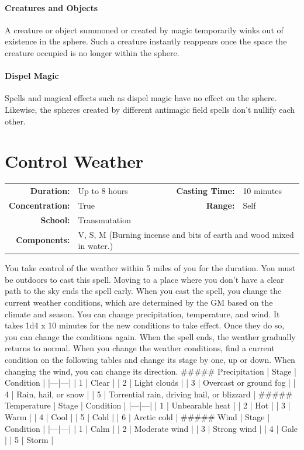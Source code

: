 \documentclass[12pt,showtrims]{memoir}
\begin{document}
\paragraph{Creatures and Objects} A creature or object summoned or created by magic temporarily winks out of existence in the sphere. Such a creature instantly reappears once the space the creature occupied is no longer within the sphere. \paragraph{Dispel Magic} Spells and magical effects such as dispel magic have no effect on the sphere. Likewise, the spheres created by different antimagic field spells don't nullify each other.

\newpage
\section*{Control Weather}

{
\small\centering\vspace{-6pt}
\begin{tabular}{rlrl}
\toprule

\textbf{Duration:} & Up to 8 hours &
\textbf{Casting Time:} & 10 minutes \\
\textbf{Concentration:} & True &
\textbf{Range:} & Self \\
\textbf{School:} & Transmutation \\
\textbf{Components:} & \multicolumn{3}{p{0.7\textwidth}}{V, S, M (Burning incense and bits of earth and wood mixed in water.)}\\

\bottomrule
\end{tabular}
}

\vspace{1\baselineskip}\noindent You take control of the weather within 5 miles of you for the duration. You must be outdoors to cast this spell. Moving to a place where you don't have a clear path to the sky ends the spell early. When you cast the spell, you change the current weather conditions, which are determined by the GM based on the climate and season. You can change precipitation, temperature, and wind. It takes 1d4 x 10 minutes for the new conditions to take effect. Once they do so, you can change the conditions again. When the spell ends, the weather gradually returns to normal. When you change the weather conditions, find a current condition on the following tables and change its stage by one, up or down. When changing the wind, you can change its direction. \#\#\#\#\# Precipitation | Stage | Condition | |---|---| | 1 | Clear | | 2 | Light clouds | | 3 | Overcast or ground fog | | 4 | Rain, hail, or snow | | 5 | Torrential rain, driving hail, or blizzard | \#\#\#\#\# Temperature | Stage | Condition | |---|---| | 1 | Unbearable heat | | 2 | Hot | | 3 | Warm | | 4 | Cool | | 5 | Cold | | 6 | Arctic cold | \#\#\#\#\# Wind | Stage | Condition | |---|---| | 1 | Calm | | 2 | Moderate wind | | 3 | Strong wind | | 4 | Gale | | 5 | Storm |
\end{document}
